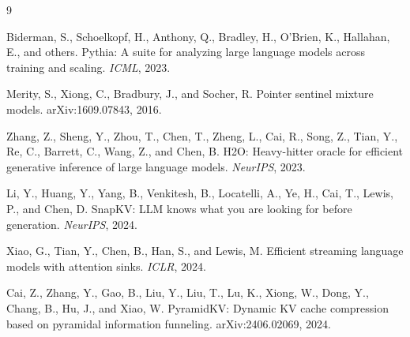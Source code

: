 \documentclass{article}
\begin{document}
{\small
\begin{thebibliography}{9}

Biderman, S., Schoelkopf, H., Anthony, Q., Bradley, H., O'Brien, K., Hallahan, E., and others.
\newblock Pythia: A suite for analyzing large language models across training and scaling.
\newblock \emph{ICML}, 2023.

Merity, S., Xiong, C., Bradbury, J., and Socher, R.
\newblock Pointer sentinel mixture models.
\newblock arXiv:1609.07843, 2016.

Zhang, Z., Sheng, Y., Zhou, T., Chen, T., Zheng, L., Cai, R., Song, Z., Tian, Y.,
Re, C., Barrett, C., Wang, Z., and Chen, B.
\newblock H2O: Heavy-hitter oracle for efficient generative inference of large
language models.
\newblock \emph{NeurIPS}, 2023.

Li, Y., Huang, Y., Yang, B., Venkitesh, B., Locatelli, A., Ye, H., Cai, T.,
Lewis, P., and Chen, D.
\newblock SnapKV: LLM knows what you are looking for before generation.
\newblock \emph{NeurIPS}, 2024.

Xiao, G., Tian, Y., Chen, B., Han, S., and Lewis, M.
\newblock Efficient streaming language models with attention sinks.
\newblock \emph{ICLR}, 2024.

Cai, Z., Zhang, Y., Gao, B., Liu, Y., Liu, T., Lu, K., Xiong, W., Dong, Y.,
Chang, B., Hu, J., and Xiao, W.
\newblock PyramidKV: Dynamic KV cache compression based on pyramidal information
funneling.
\newblock arXiv:2406.02069, 2024.

\end{thebibliography}
}
\end{document}
